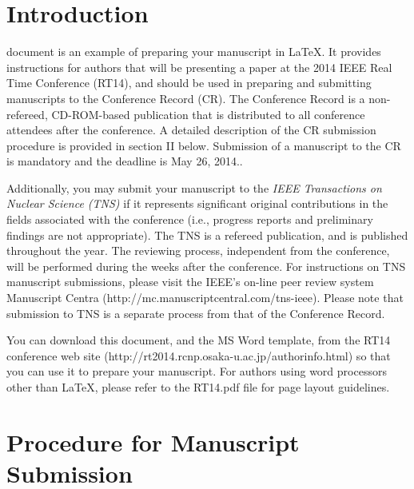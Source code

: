 \documentclass[journal]{IEEEtran}
\begin{document}
\section{Introduction}
% 
% 
% 
% 
 document is an example of preparing your manuscript in {\LaTeX}. It provides instructions for authors that will be presenting a paper at the 2014 IEEE Real Time Conference (RT14), and should be used in preparing and submitting manuscripts to the Conference Record (CR). The Conference Record is a non-refereed, CD-ROM-based publication that is distributed to all conference attendees after the conference.  A detailed description of the CR submission procedure is provided in section II below. Submission of a manuscript to the CR is mandatory and the deadline is May 26, 2014..

Additionally, you may submit your manuscript to the \emph{IEEE Transactions on Nuclear Science (TNS)} if it represents significant original contributions in the fields associated with the conference (i.e., progress reports and preliminary findings are not appropriate).  The TNS is a refereed publication, and is published throughout the year. The reviewing process, independent from the conference, will be performed during the weeks after the conference. For instructions on TNS  manuscript submissions, please visit the IEEE's on-line peer review system Manuscript Centra   (http://mc.manuscriptcentral.com/tns-ieee). Please note that submission to TNS  is a separate process from that of the Conference Record.

You can download this document, and the MS Word template, from the RT14 conference web site (http://rt2014.rcnp.osaka-u.ac.jp/authorinfo.html) so that you can use it to prepare your manuscript.  For authors using word processors other than {\LaTeX}, please refer to the RT14.pdf file for page layout guidelines. 


\section{Procedure for Manuscript Submission}
\end{document}
